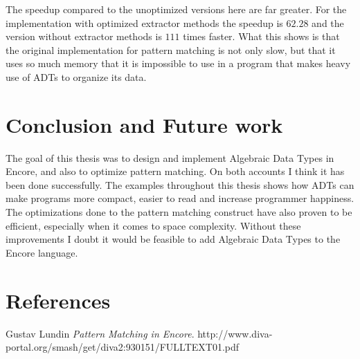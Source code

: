\documentclass[10pt]{report}
\begin{document}
{
\par{The speedup compared to the unoptimized versions here are far greater. For the implementation with optimized extractor methods the speedup is $62.28$ and the version without extractor methods is $111$ times faster. What this shows is that the original implementation for pattern matching is not only slow, but that it uses so much memory that it is impossible to use in a program that makes heavy use of ADTs to organize its data.}

\chapter{Conclusion and Future work}
\par{The goal of this thesis was to design and implement Algebraic Data Types in Encore, and also to optimize pattern matching. On both accounts I think it has been done successfully. The examples throughout this thesis shows how ADTs can make programs more compact, easier to read and increase programmer happiness\cite{happy}. The optimizations done to the pattern matching construct have also proven to be efficient, especially when it comes to space complexity. Without these improvements I doubt it would be feasible to add Algebraic Data Types to the Encore language.}

\chapter{References}


\begin{thebibliography}{9}
Gustav Lundin
\textit{Pattern Matching in Encore}.
http://www.diva-portal.org/smash/get/diva2:930151/FULLTEXT01.pdf


\end{thebibliography}}
\end{document}

